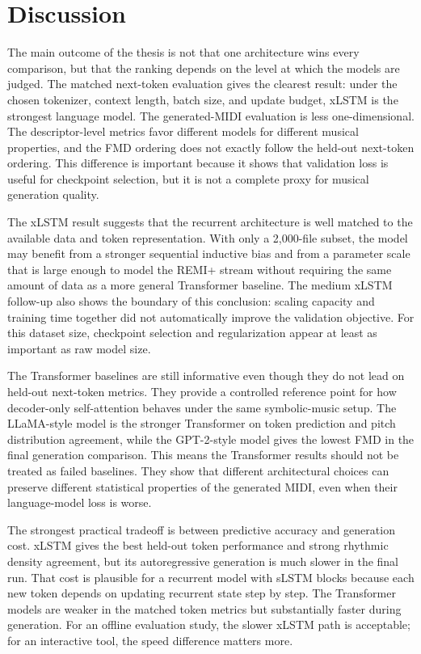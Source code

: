 \section{Discussion}
The main outcome of the thesis is not that one architecture wins every
comparison, but that the ranking depends on the level at which the models are
judged. The matched next-token evaluation gives the clearest result: under the
chosen tokenizer, context length, batch size, and update budget, xLSTM is the
strongest language model. The generated-MIDI evaluation is less one-dimensional.
The descriptor-level metrics favor different models for different musical
properties, and the FMD ordering does not exactly follow the held-out
next-token ordering. This difference is important because it shows that
validation loss is useful for checkpoint selection, but it is not a complete
proxy for musical generation quality.

The xLSTM result suggests that the recurrent architecture is well matched to the
available data and token representation. With only a 2,000-file subset, the
model may benefit from a stronger sequential inductive bias and from a parameter
scale that is large enough to model the REMI+ stream without requiring the same
amount of data as a more general Transformer baseline. The medium xLSTM
follow-up also shows the boundary of this conclusion: scaling capacity and
training time together did not automatically improve the validation objective.
For this dataset size, checkpoint selection and regularization appear at least
as important as raw model size.

The Transformer baselines are still informative even though they do not lead on
held-out next-token metrics. They provide a controlled reference point for how
decoder-only self-attention behaves under the same symbolic-music setup. The
LLaMA-style model is the stronger Transformer on token prediction and pitch
distribution agreement, while the GPT-2-style model gives the lowest FMD in the
final generation comparison. This means the Transformer results should not be
treated as failed baselines. They show that different architectural choices can
preserve different statistical properties of the generated MIDI, even when their
language-model loss is worse.

The strongest practical tradeoff is between predictive accuracy and generation
cost. xLSTM gives the best held-out token performance and strong rhythmic
density agreement, but its autoregressive generation is much slower in the final
run. That cost is plausible for a recurrent model with sLSTM blocks because each
new token depends on updating recurrent state step by step. The Transformer
models are weaker in the matched token metrics but substantially faster during
generation. For an offline evaluation study, the slower xLSTM path is
acceptable; for an interactive tool, the speed difference matters more.

